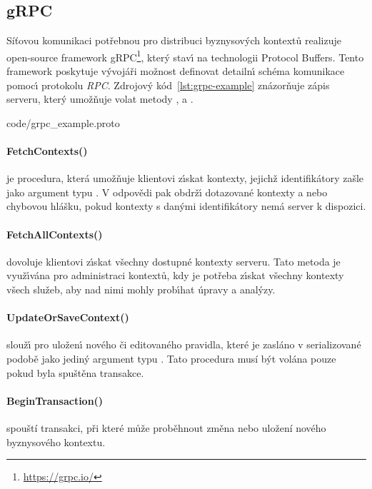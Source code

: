 \subsection{gRPC}

Síťovou komunikaci potřebnou pro distribuci byznysových kontextů realizuje
open-source framework gRPC\footnote{\url{https://grpc.io/}}, kter\'y stav\'{\i}
na technologii Protocol Buffers. Tento framework poskytuje v\'yvojáři
možnost definovat detailn\'{\i} schéma komunikace pomoc\'{\i} protokolu \textit{\gls{RPC}}.
Zdrojov\'y kód~\ref{lst:grpc-example} znázorňuje zápis serveru,
kter\'y umožňuje volat metody ,
 a .


{code/grpc_example.proto}

\paragraph{FetchContexts()} je procedura, která umožňuje klientovi
z\'{\i}skat kontexty, jejichž identifikátory zašle jako argument
typu .
V odpovědi pak obdrž\'{\i} dotazované kontexty a nebo chybovou hlášku,
pokud kontexty s dan\'ymi identifikátory nemá server k dispozici.

\paragraph{FetchAllContexts()} dovoluje klientovi z\'{\i}skat všechny
dostupné kontexty serveru. Tato metoda je využ\'{\i}vána pro administraci
kontextů, kdy je potřeba z\'{\i}skat všechny kontexty všech služeb, aby
nad nimi mohly prob\'{\i}hat úpravy a anal\'yzy.

\paragraph{UpdateOrSaveContext()} slouž\'{\i} pro uložen\'{\i} nového či
editovaného pravidla, které je zasláno v serializované podobě
jako jedin\'y argument typu .
Tato procedura musí být volána pouze pokud byla spuštěna transakce.

\paragraph{BeginTransaction()} spouští transakci, při které může proběhnout
změna nebo uložení nového byznysového kontextu.

